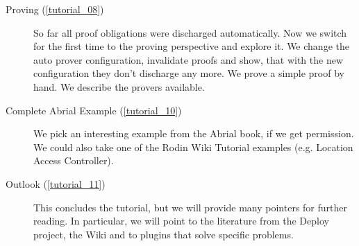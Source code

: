 \begin{description}
	\item[Proving (\ref{tutorial_08})] So far all proof obligations were discharged automatically.  Now we switch for the first time to the proving perspective and explore it.
We change the auto prover configuration, invalidate proofs and show, that with the new configuration they don't discharge any more.  We prove a simple proof by hand.  We describe the provers available.
	\item[Complete Abrial Example (\ref{tutorial_10})] We pick an interesting example from the Abrial book, if we get permission.  We could also take one of the Rodin Wiki Tutorial examples (e.g. Location Access Controller).
	\item[Outlook (\ref{tutorial_11})] This concludes the tutorial, but we will provide many pointers for further reading.  In particular, we will point to the literature from the Deploy project, the Wiki and to plugins that solve specific problems.
\end{description}

